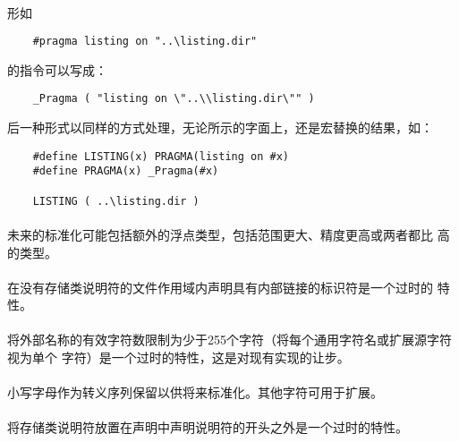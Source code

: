 \paragraph{}
\ex* 形如
\begin{lstlisting}
    #pragma listing on "..\listing.dir"
\end{lstlisting}
的指令可以写成：
\begin{lstlisting}
    _Pragma ( "listing on \"..\\listing.dir\"" )
\end{lstlisting}
后一种形式以同样的方式处理，无论所示的字面上，还是宏替换的结果，如：
\begin{lstlisting}
    #define LISTING(x) PRAGMA(listing on #x)
    #define PRAGMA(x) _Pragma(#x)

    LISTING ( ..\listing.dir )
\end{lstlisting}

\paragraph{}
未来的标准化可能包括额外的浮点类型，包括范围更大、精度更高或两者都比
高的类型。

\paragraph{}
在没有存储类说明符的文件作用域内声明具有内部链接的标识符是一个过时的
特性。

\paragraph{}
将外部名称的有效字符数限制为少于255个字符（将每个通用字符名或扩展源字符视为单个
字符）是一个过时的特性，这是对现有实现的让步。

\paragraph{}
小写字母作为转义序列保留以供将来标准化。其他字符可用于扩展。

\paragraph{}
将存储类说明符放置在声明中声明说明符的开头之外是一个过时的特性。

